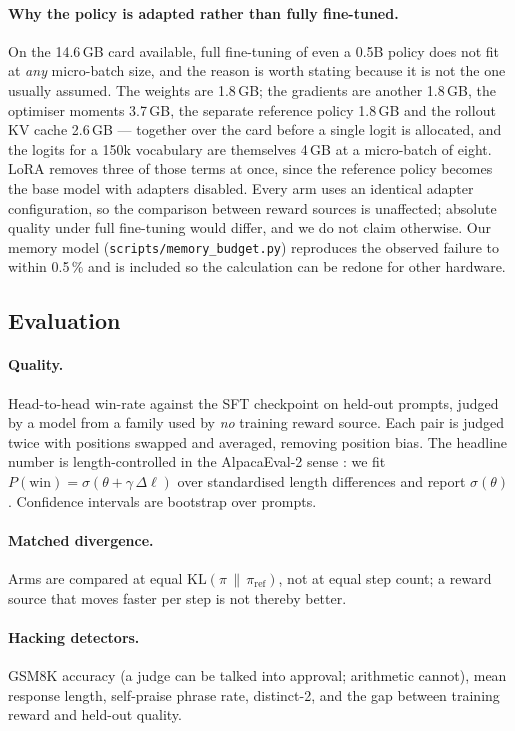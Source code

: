 \documentclass[11pt]{article}
\begin{document}
\paragraph{Why the policy is adapted rather than fully fine-tuned.} On the
14.6\,GB card available, full fine-tuning of even a 0.5B policy does not fit at
\emph{any} micro-batch size, and the reason is worth stating because it is not
the one usually assumed. The weights are 1.8\,GB; the gradients are another
1.8\,GB, the optimiser moments 3.7\,GB, the separate reference policy 1.8\,GB
and the rollout KV cache 2.6\,GB --- together over the card before a single
logit is allocated, and the logits for a 150k vocabulary are themselves
4\,GB at a micro-batch of eight. LoRA removes three of those terms at once,
since the reference policy becomes the base model with adapters disabled.
Every arm uses an identical adapter configuration, so the comparison between
reward sources is unaffected; absolute quality under full fine-tuning would
differ, and we do not claim otherwise. Our memory model
(\texttt{scripts/memory\_budget.py}) reproduces the observed failure to within
0.5\,\% and is included so the calculation can be redone for other hardware.

\subsection{Evaluation}
\label{sec:eval}
\paragraph{Quality.} Head-to-head win-rate against the SFT checkpoint on held-out
prompts, judged by a model from a family used by \emph{no} training reward
source. Each pair is judged twice with positions swapped and averaged, removing
position bias. The headline number is length-controlled in the AlpacaEval-2
sense \citep{dubois2024lengthcontrolled}: we fit
$P(\text{win}) = \sigma(\theta + \gamma\,\Delta\ell)$ over standardised length
differences and report $\sigma(\theta)$. Confidence intervals are bootstrap over
prompts.

\paragraph{Matched divergence.} Arms are compared at equal
$\mathrm{KL}(\pi \,\|\, \pi_{\text{ref}})$, not at equal step count; a reward
source that moves faster per step is not thereby better.

\paragraph{Hacking detectors.} GSM8K accuracy \citep{cobbe2021gsm8k} (a judge can be talked into
approval; arithmetic cannot), mean response length, self-praise phrase rate,
distinct-2, and the gap between training reward and held-out quality.
\end{document}
